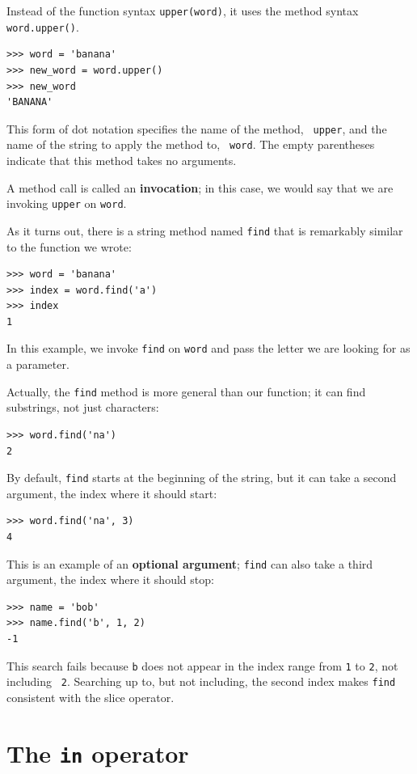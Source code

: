 \documentclass[10pt]{book}
\begin{document}
Instead of the function syntax {\tt upper(word)}, it uses
the method syntax {\tt word.upper()}.

\begin{verbatim}
>>> word = 'banana'
>>> new_word = word.upper()
>>> new_word
'BANANA'
\end{verbatim}
%
This form of dot notation specifies the name of the method, {\tt
upper}, and the name of the string to apply the method to, {\tt
word}.  The empty parentheses indicate that this method takes no
arguments.

A method call is called an {\bf invocation}; in this case, we would
say that we are invoking {\tt upper} on {\tt word}.

As it turns out, there is a string method named {\tt find} that
is remarkably similar to the function we wrote:

\begin{verbatim}
>>> word = 'banana'
>>> index = word.find('a')
>>> index
1
\end{verbatim}
%
In this example, we invoke {\tt find} on {\tt word} and pass
the letter we are looking for as a parameter.

Actually, the {\tt find} method is more general than our function;
it can find substrings, not just characters:

\begin{verbatim}
>>> word.find('na')
2
\end{verbatim}
%
By default, {\tt find} starts at the beginning of the string, but
it can take a second argument, the index where it should start:

\begin{verbatim}
>>> word.find('na', 3)
4
\end{verbatim}
%
This is an example of an {\bf optional argument};
{\tt find} can
also take a third argument, the index where it should stop:

\begin{verbatim}
>>> name = 'bob'
>>> name.find('b', 1, 2)
-1
\end{verbatim}
%
This search fails because {\tt b} does not
appear in the index range from {\tt 1} to {\tt 2}, not including {\tt
2}.  Searching up to, but not including, the second index makes
{\tt find} consistent with the slice operator.



\section{The {\tt in} operator}
\label{inboth}
\end{document}

